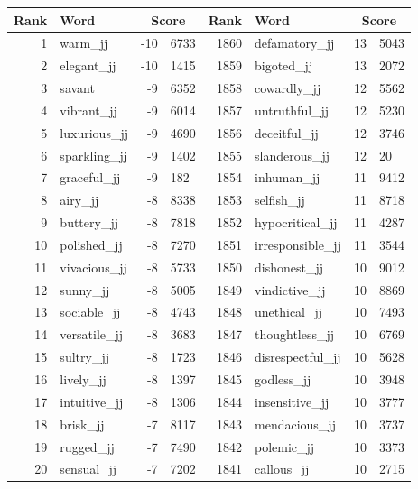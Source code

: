 \begin{table}[tbp]
    \begin{tabular}{| rlr@{.}l | rlr@{.}l |}
    \hline
    \textbf{Rank} & \textbf{Word} & \multicolumn{2}{c|}{\textbf{Score}} & \textbf{Rank} & \textbf{Word} & \multicolumn{2}{c|}{\textbf{Score}} \\
    \hline
    1 & warm\_jj & -10 & 6733    &    1860 & defamatory\_jj & 13 & 5043 \\
    2 & elegant\_jj & -10 & 1415    &    1859 & bigoted\_jj & 13 & 2072 \\
    3 & savant & -9 & 6352    &    1858 & cowardly\_jj & 12 & 5562 \\
    4 & vibrant\_jj & -9 & 6014    &    1857 & untruthful\_jj & 12 & 5230 \\
    5 & luxurious\_jj & -9 & 4690    &    1856 & deceitful\_jj & 12 & 3746 \\
    6 & sparkling\_jj & -9 & 1402    &    1855 & slanderous\_jj & 12 & 20 \\
    7 & graceful\_jj & -9 & 182    &    1854 & inhuman\_jj & 11 & 9412 \\
    8 & airy\_jj & -8 & 8338    &    1853 & selfish\_jj & 11 & 8718 \\
    9 & buttery\_jj & -8 & 7818    &    1852 & hypocritical\_jj & 11 & 4287 \\
    10 & polished\_jj & -8 & 7270    &    1851 & irresponsible\_jj & 11 & 3544 \\
    11 & vivacious\_jj & -8 & 5733    &    1850 & dishonest\_jj & 10 & 9012 \\
    12 & sunny\_jj & -8 & 5005    &    1849 & vindictive\_jj & 10 & 8869 \\
    13 & sociable\_jj & -8 & 4743    &    1848 & unethical\_jj & 10 & 7493 \\
    14 & versatile\_jj & -8 & 3683    &    1847 & thoughtless\_jj & 10 & 6769 \\
    15 & sultry\_jj & -8 & 1723    &    1846 & disrespectful\_jj & 10 & 5628 \\
    16 & lively\_jj & -8 & 1397    &    1845 & godless\_jj & 10 & 3948 \\
    17 & intuitive\_jj & -8 & 1306    &    1844 & insensitive\_jj & 10 & 3777 \\
    18 & brisk\_jj & -7 & 8117    &    1843 & mendacious\_jj & 10 & 3737 \\
    19 & rugged\_jj & -7 & 7490    &    1842 & polemic\_jj & 10 & 3373 \\
    20 & sensual\_jj & -7 & 7202    &    1841 & callous\_jj & 10 & 2715 \\

\end{tabular}
\end{table}
